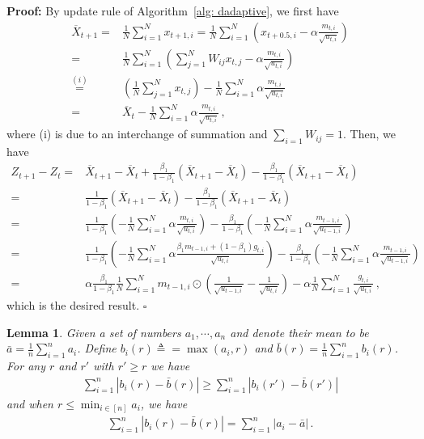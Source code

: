 \documentclass[11pt]{article}
\newtheorem{lemma}{Lemma}
\begin{document}
\noindent\textbf{Proof:} By update rule of Algorithm~\ref{alg: dadaptive}, we first have
\begin{align}
\overline X_{t+1}  = & \frac{1}{N}\sum_{i=1}^N x_{t+1,i}  
=  \frac{1}{N}\sum_{i=1}^N \left( x_{t+0.5,i} - \alpha \frac{m_{t,i}}{\sqrt{u_{t,i}}}\right) \nonumber   \\
= & \frac{1}{N}\sum_{i=1}^N \left(  \sum_{j=1}^N W_{ij}x_{t,j} - \alpha \frac{m_{t,i}}{\sqrt{u_{t,i}}}\right) \nonumber    \\
\overset{(i)}{=} &  \left(\frac{1}{N} \sum_{j=1}^N x_{t,j} \right) -\frac{1}{N} \sum_{i=1}^N   \alpha \frac{m_{t,i}}{\sqrt{u_{t,i}}}  \nonumber \\
= & \overline X_t - \frac{1}{N} \sum_{i=1}^N   \alpha \frac{m_{t,i}}{\sqrt{u_{t,i}}} \, , \nonumber 
\end{align}
where (i) is due to an interchange of summation and $\sum_{i=1} W_{ij} = 1$.
Then, we have 
\begin{align}
Z_{t+1} - Z_t =& \overline X_{t+1} - \overline X_{t} + \frac{\beta_1}{1-\beta_1} (\overline X_{t+1}- \overline X_t) - \frac{\beta_1}{1-\beta_1} (\overline X_{t+1}- \overline X_t) \nonumber   \\
= &  \frac{1}{1-\beta_1} (\overline X_{t+1}- \overline X_t) - \frac{\beta_1}{1-\beta_1} (\overline X_{t+1}- \overline X_t)  \nonumber  \\
= & \frac{1}{1-\beta_1} \left(- \frac{1}{N} \sum_{i=1}^N   \alpha \frac{m_{t,i}}{\sqrt{u_{t,i}}}\right) - \frac{\beta_1}{1-\beta_1} \left(- \frac{1}{N} \sum_{i=1}^N   \alpha \frac{m_{t-1,i}}{\sqrt{u_{t-1,i}}}\right) \nonumber  \\
= & \frac{1}{1-\beta_1} \left(- \frac{1}{N} \sum_{i=1}^N   \alpha \frac{\beta_1 m_{t-1,i} + (1-\beta_1) g_{t,i}}{\sqrt{u_{t,i}}}\right) - \frac{\beta_1}{1-\beta_1} \left(- \frac{1}{N} \sum_{i=1}^N   \alpha \frac{m_{t-1,i}}{\sqrt{u_{t-1,i}}}\right)  \nonumber  \\
= & \alpha \frac{\beta_1}{1-\beta_1}  \frac{1}{N} \sum_{i=1}^N m_{t-1	,i} \odot (\frac{1}{\sqrt{u_{t-1,i}}} - \frac{1}{\sqrt{u_{t,i}}}) - \alpha \frac{1}{N} \sum_{i=1}^N \frac{g_{t,i}}{\sqrt{u_{t,i}}} \, , \nonumber 
\end{align}
which is the desired result. \hfill $\square$


\begin{lemma}\label{lem: mean_after_max}
	Given  a set of numbers $a_1,\cdots,a_n$ and denote their mean to be $\bar a = \frac{1}{n}\sum_{i=1}^n a_i$. Define $b_i(r) \triangleq = \max(a_i,r)$ and $\bar b (r) =  \frac{1}{n}\sum_{i=1}^n b_i(r)$. For any $r$ and $r'$ with $r' \geq r$ we have 
	\begin{align}\label{eq: r_decrease}
	\sum_{i=1}^n |b_i(r) - \bar b(r)| \geq \sum_{i=1}^n |b_i(r') - \bar b(r')|
	\end{align}
	and when $r \leq \min_{i \in [n]} a_i$, we have
	\begin{align}\label{eq: r_reduce}
	\sum_{i=1}^n |b_i(r) - \bar b(r)| =   \sum_{i=1}^n |a_i - \bar a| \, .
	\end{align}
\end{lemma}
\end{document}
